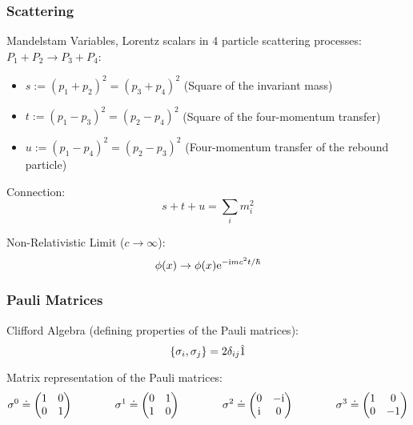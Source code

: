 		\subsubsection{Scattering}
			\noindent
			Mandelstam Variables, \ie Lorentz scalars in 4 particle scattering processes: $P_1 + P_2 \to P_3 + P_4$:
			\begin{itemize}\itemsep -0pt
				\item $s:=(p_1+p_2)^2=(p_3+p_4)^2$ \hfill{(Square of the invariant mass)}
				\item $t:=(p_1-p_3)^2=(p_2-p_4)^2$ \hfill{(Square of the four-momentum transfer)}
				\item $u:=(p_1-p_4)^2=(p_2-p_3)^2$ \hfill{(Four-momentum transfer of the rebound particle)}
			\end{itemize}

			\noindent
			Connection:
			\begin{equation}
				s+t+u = \sum_i m_i^2
			\end{equation}

			\noindent
			Non-Relativistic Limit ($c \to\infty$):
			\begin{equation}
				\phi(x) \to \phi(x) \mathrm{e}^{-\mathrm{i} m c^2 t/\hbar}
			\end{equation}

		\subsubsection{Pauli Matrices}
			Clifford Algebra (defining properties of the Pauli matrices):
			\begin{equation}
				\acomm{\sigma_i}{\sigma_j} = 2\delta_{ij}\hat{1}
			\end{equation}


			\noindent
			Matrix representation of the Pauli matrices:
			\begin{equation}
				\label{Eq:PauliMatricesQFT}
				\begin{aligned}
					\sigma^0 \doteq \mqty(
					1 & 0 \\
					0 & 1 \\
					) &&\hsp
					\sigma^1 \doteq \mqty(
					0 & 1 \\
					1 & 0 \\
					) &&\hsp
					\sigma^2 \doteq \mqty(
					0 & -\i \\
					\i & 0 \\
					) &&\hsp
					\sigma^3 \doteq \mqty(
					1 & 0 \\
					0 & -1 \\
					)
				\end{aligned}
			\end{equation}

